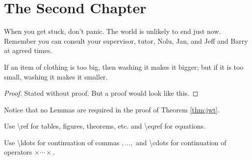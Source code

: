 \chapter{The Second Chapter}

When you get stuck, don't panic. 
The world is unlikely to end just now. 
Remember you can consult your supervisor, tutor, Nolu, Jan, 
and Jeff and Barry at agreed times. 

\begin{thm}
\label{thm:jwt}
If an item of clothing is too big, then washing it makes it bigger;
but if it is too small, washing it makes it smaller.
\end{thm}
\begin{proof}
Stated without proof. But a proof would look like this. 
\end{proof}

Notice that no Lemmas are required in the proof of Theorem \ref{thm:jwt}.

Use \textbackslash ref for tables, figures, theorems, etc. and \textbackslash eqref for equations.

Use \textbackslash ldots for continuation of commas $,\ldots,$ and \textbackslash cdots for continuation of operators $\times\cdots\times$.
